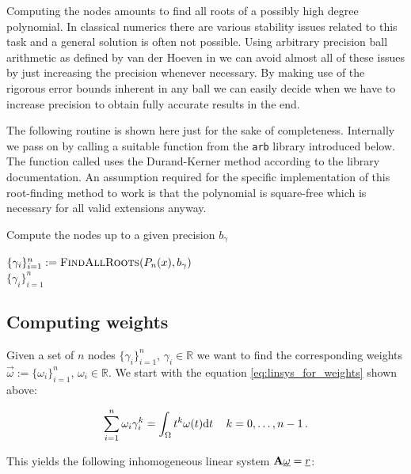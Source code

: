 \documentclass[a4paper,10pt]{article}
\begin{document}
Computing the nodes amounts to find all roots of a possibly high degree
polynomial. In classical numerics there are various stability issues related
to this task and a general solution is often not possible. Using arbitrary precision
ball arithmetic as defined by van der Hoeven in \cite{vdH:ball:greifswald, vdH:ball}
we can avoid almost all of these issues by just increasing the precision
whenever necessary. By making use of the rigorous error bounds inherent in any ball
we can easily decide when we have to increase precision to obtain fully accurate
results in the end.

The following routine is shown here just for the sake of completeness. Internally
we pass on by calling a suitable function from the \texttt{arb} library introduced below.
The function called uses the Durand-Kerner method according to the library documentation.
An assumption required for the specific implementation of this root-finding method to work
is that the polynomial is square-free which is necessary for all valid extensions anyway.

\begin{algorithm}
  \caption{Compute the nodes up to a given precision $b_{\gamma}$}
  \begin{algorithmic}
    \State $\{\gamma_i\}_{i=1}^{n} := \textsc{FindAllRoots}(P_n(x), b_{\gamma})$ \\
    \Return $\{\gamma_i\}_{i=1}^{n}$
    \EndProcedure
  \end{algorithmic}
\end{algorithm}


\subsection{Computing weights}

Given a set of $n$ nodes $\{\gamma_i\}_{i=1}^{n}$,  $\gamma_i \in \mathbb{R}$ we want
to find the corresponding weights $\vec{\omega} := \{\omega_i\}_{i=1}^{n}$, $\omega_i \in \mathbb{R}$.
We start with the equation \eqref{eq:linsys_for_weights} shown above:

\begin{equation}
  \sum_{i=1}^{n} \omega_i \gamma_i^k = \int_{\Omega} t^k \omega(t) \mathrm{d}t \,
  \quad k = 0, \ldots, n-1 \,.
\end{equation}

This yields the following inhomogeneous linear system $\mathbf{A} \underline{\omega} = \underline{r}$:
\end{document}
